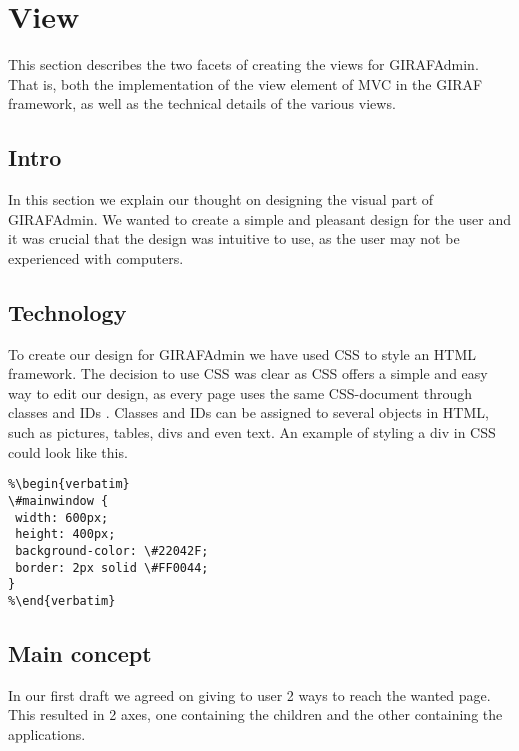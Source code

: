 \section{View}
\label{view}
This section describes the two facets of creating the views for GIRAFAdmin. That is, both the implementation of the view element of MVC in the GIRAF framework, as well as the technical details of the various views.

\subsection{Intro}
In this section we explain our thought on designing the visual part of GIRAFAdmin. We wanted to create a simple and pleasant design for the user and it was crucial that the design was intuitive to use, as the user may not be experienced with computers. 


\subsection{Technology}
To create our design for GIRAFAdmin we have used CSS to style an HTML framework. The decision to use CSS was clear as CSS offers a simple and easy way to edit our design, as every page uses the same CSS-document through classes and IDs . Classes and IDs can be assigned to several objects in HTML, such as pictures, tables, divs and even text. An example of styling a div in CSS could look like this. 

\begin{lstlisting}
%\begin{verbatim}
\#mainwindow {	
 width: 600px;
 height: 400px;
 background-color: \#22042F;
 border: 2px solid \#FF0044;
}
%\end{verbatim}
\end{lstlisting}


\subsection{Main concept}
In our first draft we agreed on giving to user 2 ways to reach the wanted page. This resulted in 2 axes, one containing the children and the other containing the applications. 


